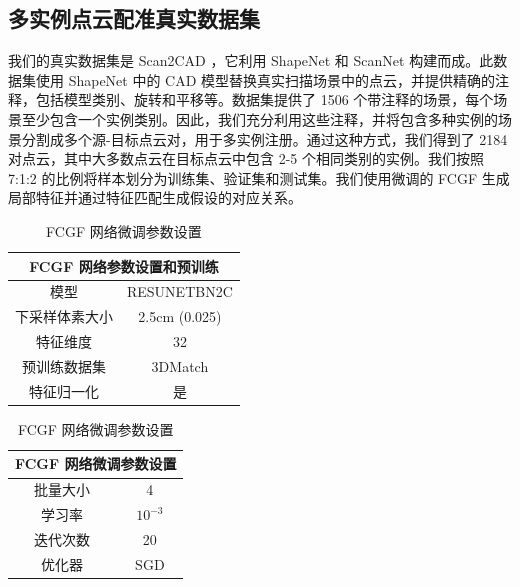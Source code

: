 \subsection{多实例点云配准真实数据集}
我们的真实数据集是 Scan2CAD ，它利用 ShapeNet 和 ScanNet 构建而成。此数据集使用 ShapeNet 中的 CAD 模型替换真实扫描场景中的点云，并提供精确的注释，包括模型类别、旋转和平移等。数据集提供了 1506 个带注释的场景，每个场景至少包含一个实例类别。因此，我们充分利用这些注释，并将包含多种实例的场景分割成多个源-目标点云对，用于多实例注册。通过这种方式，我们得到了 2184 对点云，其中大多数点云在目标点云中包含 2-5 个相同类别的实例。我们按照 7:1:2 的比例将样本划分为训练集、验证集和测试集。我们使用微调的 FCGF\cite{FCGF2019} 生成局部特征并通过特征匹配生成假设的对应关系。
\begin{table}[h]
    \centering
    \vspace{-1.0cm}
    \begin{minipage}{0.45\textwidth}
        \centering
        \caption{FCGF 网络参数设置和预训练}
        \label{tab:fcgf}
        \begin{tabular}{cc}
        \toprule
        \multicolumn{2}{c}{FCGF 网络参数设置和预训练} \\ 
        \midrule
        模型                 & RESUNETBN2C      \\ 
        下采样体素大小          & 2.5cm (0.025)    \\ 
        特征维度                & 32               \\ 
        预训练数据集             & 3DMatch          \\ 
        特征归一化              & 是               \\ 
        \bottomrule
        \end{tabular}
    \end{minipage}
    \hfill
    \begin{minipage}{0.45\textwidth}
        \centering
        \caption{FCGF 网络微调参数设置}
        \label{tab:fcgf_finetune}
        \begin{tabular}{cc}
        \toprule
        \multicolumn{2}{c}{FCGF 网络微调参数设置} \\ 
        \midrule
        批量大小               & 4                 \\ 
        学习率                 & $10^{-3}$         \\ 
        迭代次数                & 20                \\ 
        优化器                 & SGD               \\ 
        \bottomrule
        \end{tabular}
    \end{minipage}
    \vspace{-1.0cm}
\end{table}

